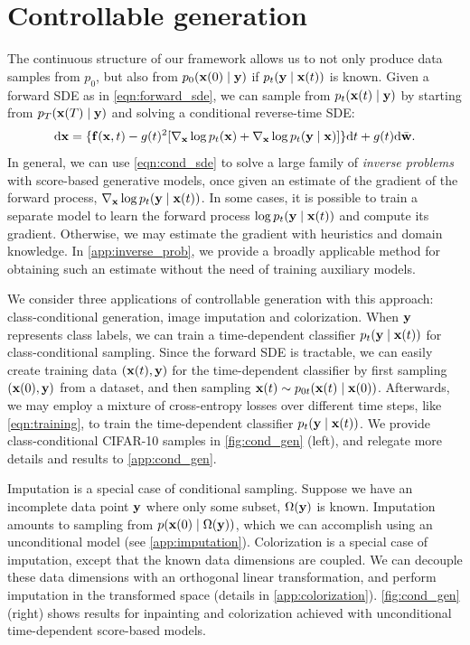 \section{Controllable generation}
The continuous structure of our framework allows us to not only produce data samples from $p_0$, but also from $p_0(\mathbf{x}(0) \mid \mathbf{y})$ if $p_t(\mathbf{y} \mid \mathbf{x}(t))$ is known. %
Given a forward SDE as in \cref{eqn:forward_sde}, we can sample from $p_t(\mathbf{x}(t) \mid \mathbf{y})$ by starting from $p_T(\mathbf{x}(T) \mid \mathbf{y})$ and solving a conditional reverse-time SDE:
\begin{align}
\mathrm{d} \mathbf{x} = \{\mathbf{f}(\mathbf{x}, t) - g(t)^2[ \nabla_{\mathbf{x}}  \log p_t(\mathbf{x})+  \nabla_{\mathbf{x}}  \log p_t(\mathbf{y} \mid \mathbf{x})]\} \mathrm{d} t + g(t) \mathrm{d} \bar{\mathbf{w}}.\label{eqn:cond_sde}
\end{align}
In general, we can use \cref{eqn:cond_sde} to solve a large family of \emph{inverse problems} with score-based generative models, once given an estimate of the gradient of the forward process, $\nabla_{\mathbf{x}} \log p_t(\mathbf{y} \mid \mathbf{x}(t) )$. In some cases, it is possible to train a separate model to learn the forward process $\log p_t(\mathbf{y} \mid \mathbf{x}(t))$ and compute its gradient. Otherwise, we may estimate the gradient with heuristics and domain knowledge. In \cref{app:inverse_prob}, we provide a broadly applicable method for obtaining such an estimate without the need of training auxiliary models.

We consider three applications of controllable generation with this approach: class-conditional generation, image imputation and colorization. When $\mathbf{y}$ represents class labels, we can train a time-dependent classifier $p_t(\mathbf{y} \mid \mathbf{x}(t))$ for class-conditional sampling. Since the forward SDE is tractable, we can easily create training data $(\mathbf{x}(t), \mathbf{y})$ for the time-dependent classifier
by first sampling $(\mathbf{x}(0), \mathbf{y})$ from a dataset, and then sampling $\mathbf{x}(t) \sim p_{0t}(\mathbf{x}(t) \mid \mathbf{x}(0))$. Afterwards, we may employ a mixture of cross-entropy losses over different time steps, like \cref{eqn:training}, to train the time-dependent classifier $p_t(\mathbf{y} \mid \mathbf{x}(t))$. We provide class-conditional CIFAR-10 samples in \cref{fig:cond_gen} (left), and relegate more details and results to \cref{app:cond_gen}.

Imputation is a special case of conditional sampling.
Suppose we have an incomplete data point $\mathbf{y}$ where only some subset, $\Omega(\mathbf{y})$ is known. Imputation amounts to sampling from $p(\mathbf{x}(0) \mid \Omega(\mathbf{y}))$, which we can accomplish using an unconditional model (see \cref{app:imputation}). Colorization is a special case of imputation, except that the known data dimensions are coupled. We can decouple these data dimensions with an orthogonal linear transformation, and perform imputation in the transformed space (details in \cref{app:colorization}). \cref{fig:cond_gen} (right) shows results for inpainting and colorization achieved with unconditional time-dependent score-based models.


